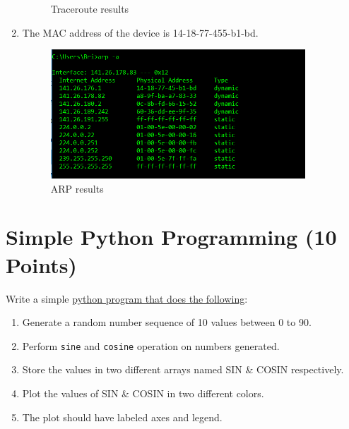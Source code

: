 \documentclass{WeSTassignment}
\begin{document}
\begin{enumerate}
\begin{figure}[h]
   \caption{Traceroute results}
     \label{fig:tracert}
\end{figure}
\item The MAC address of the device is 14-18-77-455-b1-bd.
\begin{figure}[h]
  \centering
  \includegraphics[width=0.9\textwidth]{arp.png}
   \caption{ARP results}
     \label{fig:arp}
\end{figure}
\end{enumerate}



\section{Simple Python Programming (10 Points)}

Write a simple \underline{python program that does the following}:
\begin{enumerate}
\item Generate a random number sequence of 10 values between 0 to 90. 
\item Perform \texttt{sine} and \texttt{cosine} operation on numbers generated. 
\item Store the values in two different arrays named SIN \& COSIN respectively. 
\item Plot the values of SIN \& COSIN in two different colors. 
\item The plot should have labeled axes and legend.
\end{enumerate}




\makefooter
\end{document}
